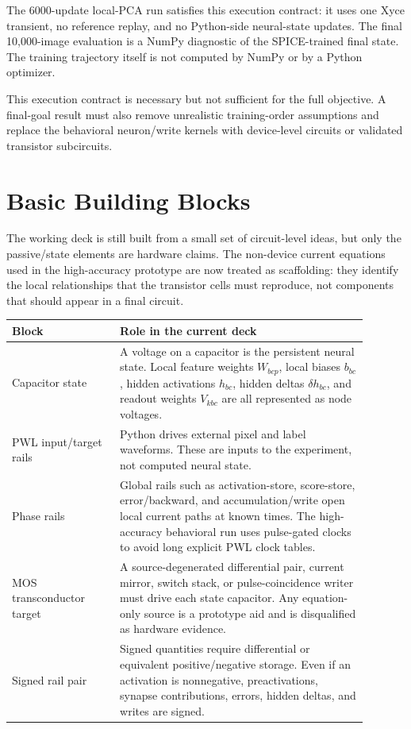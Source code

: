 \documentclass[11pt]{article}
\begin{document}
The 6000-update local-PCA run satisfies this execution contract: it uses one
Xyce transient, no reference replay, and no Python-side neural-state updates.
The final 10,000-image evaluation is a NumPy diagnostic of the SPICE-trained
final state.  The training trajectory itself is not computed by NumPy or by a
Python optimizer.

This execution contract is necessary but not sufficient for the full objective.
A final-goal result must also remove unrealistic training-order assumptions and
replace the behavioral neuron/write kernels with device-level circuits or
validated transistor subcircuits.

\section{Basic Building Blocks}

The working deck is still built from a small set of circuit-level ideas, but
only the passive/state elements are hardware claims.  The non-device current
equations used in the high-accuracy prototype are now treated as scaffolding:
they identify the local relationships that the transistor cells must reproduce,
not components that should appear in a final circuit.

\begin{center}
  \begin{tabular}{>{\raggedright\arraybackslash}p{0.27\linewidth}>{\raggedright\arraybackslash}p{0.62\linewidth}}
    \toprule
    Block & Role in the current deck \\
    \midrule
    Capacitor state &
    A voltage on a capacitor is the persistent neural state.  Local feature
    weights \(W_{bcp}\), local biases \(b_{bc}\), hidden activations \(h_{bc}\),
    hidden deltas \(\delta h_{bc}\), and readout weights \(V_{kbc}\) are all
    represented as node voltages. \\
    \addlinespace
    PWL input/target rails &
    Python drives external pixel and label waveforms.  These are inputs to the
    experiment, not computed neural state. \\
    \addlinespace
    Phase rails &
    Global rails such as activation-store, score-store, error/backward, and
    accumulation/write open local current paths at known times.  The
    high-accuracy behavioral run uses pulse-gated clocks to avoid long explicit
    PWL clock tables. \\
    \addlinespace
    MOS transconductor target &
    A source-degenerated differential pair, current mirror, switch stack, or
    pulse-coincidence writer must drive each state capacitor.  Any equation-only
    source is a prototype aid and is disqualified as hardware evidence. \\
    \addlinespace
    Signed rail pair &
    Signed quantities require differential or equivalent positive/negative
    storage.  Even if an activation is nonnegative, preactivations, synapse
    contributions, errors, hidden deltas, and writes are signed. \\
    \bottomrule
  \end{tabular}
\end{center}
\end{document}
